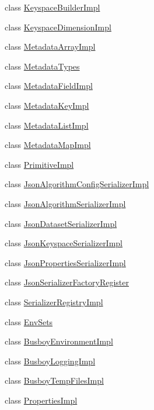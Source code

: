 \begin{DoxyCompactItemize}
class \hyperlink{classBUSBOY_1_1KeyspaceBuilderImpl}{KeyspaceBuilderImpl}
\item 
class \hyperlink{classBUSBOY_1_1KeyspaceDimensionImpl}{KeyspaceDimensionImpl}
\item 
class \hyperlink{classBUSBOY_1_1MetadataArrayImpl}{MetadataArrayImpl}
\item 
class \hyperlink{classBUSBOY_1_1MetadataTypes}{MetadataTypes}
\item 
class \hyperlink{classBUSBOY_1_1MetadataFieldImpl}{MetadataFieldImpl}
\item 
class \hyperlink{classBUSBOY_1_1MetadataKeyImpl}{MetadataKeyImpl}
\item 
class \hyperlink{classBUSBOY_1_1MetadataListImpl}{MetadataListImpl}
\item 
class \hyperlink{classBUSBOY_1_1MetadataMapImpl}{MetadataMapImpl}
\item 
class \hyperlink{classBUSBOY_1_1PrimitiveImpl}{PrimitiveImpl}
\item 
class \hyperlink{classBUSBOY_1_1JsonAlgorithmConfigSerializerImpl}{JsonAlgorithmConfigSerializerImpl}
\item 
class \hyperlink{classBUSBOY_1_1JsonAlgorithmSerializerImpl}{JsonAlgorithmSerializerImpl}
\item 
class \hyperlink{classBUSBOY_1_1JsonDatasetSerializerImpl}{JsonDatasetSerializerImpl}
\item 
class \hyperlink{classBUSBOY_1_1JsonKeyspaceSerializerImpl}{JsonKeyspaceSerializerImpl}
\item 
class \hyperlink{classBUSBOY_1_1JsonPropertiesSerializerImpl}{JsonPropertiesSerializerImpl}
\item 
class \hyperlink{classBUSBOY_1_1JsonSerializerFactoryRegister}{JsonSerializerFactoryRegister}
\item 
class \hyperlink{classBUSBOY_1_1SerializerRegistryImpl}{SerializerRegistryImpl}
\item 
class \hyperlink{classBUSBOY_1_1EnvSets}{EnvSets}
\item 
class \hyperlink{classBUSBOY_1_1BusboyEnvironmentImpl}{BusboyEnvironmentImpl}
\item 
class \hyperlink{classBUSBOY_1_1BusboyLoggingImpl}{BusboyLoggingImpl}
\item 
class \hyperlink{classBUSBOY_1_1BusboyTempFilesImpl}{BusboyTempFilesImpl}
\item 
class \hyperlink{classBUSBOY_1_1PropertiesImpl}{PropertiesImpl}
\end{DoxyCompactItemize}
